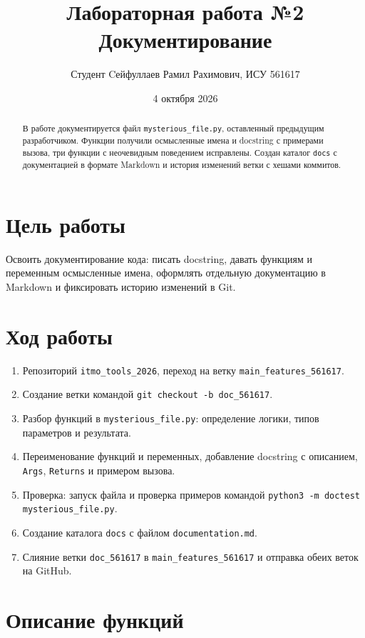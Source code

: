\documentclass[a4paper,12pt]{article}
\title{Лабораторная работа №2\\Документирование}
\author{Студент Cейфуллаев Рамил Рахимович, ИСУ 561617}
\date{4 октября 2026}
\begin{document}
\maketitle

\begin{abstract}
В работе документируется файл \texttt{mysterious\_file.py}, оставленный предыдущим разработчиком. Функции получили осмысленные имена и docstring с примерами вызова, три функции с неочевидным поведением исправлены. Создан каталог \texttt{docs} с документацией в формате Markdown и история изменений ветки с хешами коммитов.
\end{abstract}

\section{Цель работы}

Освоить документирование кода: писать docstring, давать функциям и переменным осмысленные имена, оформлять отдельную документацию в Markdown и фиксировать историю изменений в Git.

\section{Ход работы}

\begin{enumerate}
\item Репозиторий \texttt{itmo\_tools\_2026}, переход на ветку \texttt{main\_features\_561617}.
\item Создание ветки командой \texttt{git checkout -b doc\_561617}.
\item Разбор функций в \texttt{mysterious\_file.py}: определение логики, типов параметров и результата.
\item Переименование функций и переменных, добавление docstring с описанием, \texttt{Args}, \texttt{Returns} и примером вызова.
\item Проверка: запуск файла и проверка примеров командой \texttt{python3 -m doctest mysterious\_file.py}.
\item Создание каталога \texttt{docs} с файлом \texttt{documentation.md}.
\item Слияние ветки \texttt{doc\_561617} в \texttt{main\_features\_561617} и отправка обеих веток на GitHub.
\end{enumerate}

\section{Описание функций}
\end{document}
